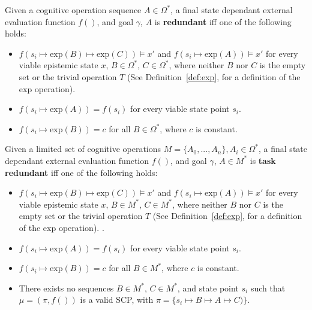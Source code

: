 \begin{definition} \label{lem:uniredundant}
Given a cognitive operation sequence $A \in \Omega^*$, a final state dependant external evaluation function $f()$, and goal $\gamma$, $A$ is \textbf{redundant} iff one of the following holds:
\begin{itemize}
\item $f(s_i \longmapsto \text{exp}(B) \longmapsto \text{exp}(C)) \models x'$ and $f(s_i \longmapsto \text{exp}(A)) \models x'$ for every viable epistemic state $x$, $B \in \Omega^*$, $C \in \Omega^*$, where neither $B$ nor $C$ is the empty set or the trivial operation $T$ (See Definition~\ref{def:exp}, for a definition of the exp operation). 
\item $f(s_i \longmapsto \text{exp}(A)) = f(s_i)$ for every viable state point $s_i$.
\item $f(s_i \longmapsto \text{exp}(B))=c$ for all $B \in \Omega^*$, where $c$ is constant.
\end{itemize}
\end{definition}

\begin{definition} \label{lem:taskredundant}
Given a limited set of cognitive operations $M=\{A_0, ..., A_n\}, A_i \in \Omega^*$, a final state dependant external evaluation function  $f()$, and goal $\gamma$, $A \in M^*$ is \textbf{task redundant} iff one of the following holds:
\begin{itemize}
\item $f(s_i \longmapsto \text{exp}(B) \longmapsto \text{exp}(C)) \models x'$ and $f(s_i \longmapsto \text{exp}(A)) \models x'$ for every viable epistemic state $x$, $B \in M^*$, $C \in M^*$, where neither $B$ nor $C$ is the empty set or the trivial operation $T$ (See Definition~\ref{def:exp}, for a definition of the exp operation). . 
\item $f(s_i \longmapsto \text{exp}(A)) = f(s_i)$ for every viable state point $s_i$.
\item $f(s_i \longmapsto \text{exp}(B))=c$ for all $B \in M^*$, where $c$ is constant.
\item There exists no sequences $B \in M^*$, $C \in M^*$, and state point $s_i$ such that $\mu=(\pi,f())$ is a valid SCP, with $\pi=\{s_i \longmapsto B \longmapsto A \longmapsto C)\}$.
\end{itemize}
\end{definition}


